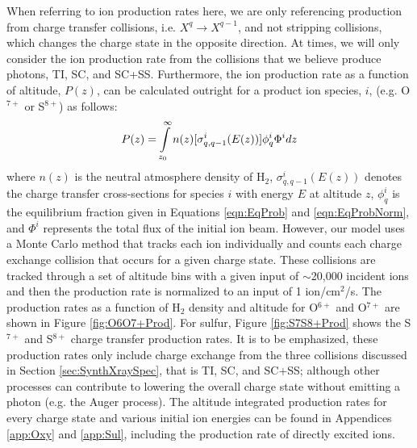 \documentclass[draft]{agujournal2018}
\begin{document}
When referring to ion production rates here, we are only referencing production from charge transfer collisions, i.e. $X^q \rightarrow X^{q-1}$, and not stripping collisions, which changes the charge state in the opposite direction.
At times, we will only consider the ion production rate from the collisions that we believe produce photons, TI, SC, and SC+SS.
Furthermore, the ion production rate as a function of altitude, $P(z)$, can be calculated outright for a product ion species, $i$, (e.g. O$^{7+}$ or S$^{8+}$) as follows:
\begin{equation}
    P(z)=\int\displaylimits_{z_0}^{\infty}n(z)[\sigma_{q,q-1}^i(E(z))]\phi_q^i\Phi^idz
\end{equation}
where $n(z)$ is the neutral atmosphere density of H$_2$, $\sigma_{q,q-1}^i(E(z))$ denotes the charge transfer cross-sections for species $i$ with energy $E$ at altitude $z$, $\phi_q^i$ is the equilibrium fraction given in Equations \ref{eqn:EqProb} and \ref{eqn:EqProbNorm}, and $\Phi^i$ represents the total flux of the initial ion beam.
However, our model uses a Monte Carlo method that tracks each ion individually and counts each charge exchange collision that occurs for a given charge state.
These collisions are tracked through a set of altitude bins with a given input of $\sim$20,000 incident ions and then the production rate is normalized to an input of 1 ion/cm$^2$/s.
The production rates as a function of H$_2$ density and altitude for O$^{6+}$ and O$^{7+}$ are shown in Figure \ref{fig:O6O7+Prod}.
For sulfur, Figure \ref{fig:S7S8+Prod} shows the S$^{7+}$ and S$^{8+}$ charge transfer production rates.
It is to be emphasized, these production rates only include charge exchange from the three collisions discussed in Section \ref{sec:SynthXraySpec}, that is TI, SC, and SC+SS; although other processes can contribute to lowering the overall charge state without emitting a photon (e.g. the Auger process).
The altitude integrated production rates for every charge state and various initial ion energies can be found in Appendices \ref{app:Oxy} and \ref{app:Sul}, including the production rate of directly excited ions.
\end{document}

